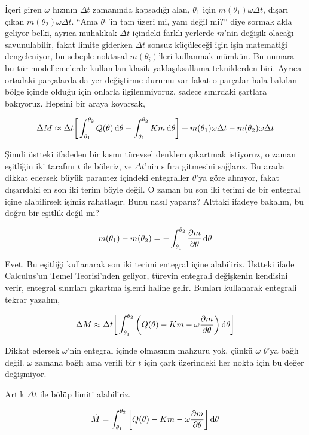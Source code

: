 \documentclass[12pt,fleqn]{article}\usepackage{../../common}
\begin{document}
İçeri giren $\omega$ hızının $\Delta t$ zamanında kapsadığı alan,
$\theta_1$ için $m(\theta_1) \omega \Delta t$, dışarı çıkan
$m(\theta_2) \omega \Delta t$. ``Ama $\theta_1$'in tam üzeri mi, yanı değil
mi?'' diye sormak akla geliyor belki, ayrıca muhakkak $\Delta t$ içindeki
farklı yerlerde $m$'nin değişik olacağı savunulabilir, fakat limite
giderken $\Delta t$ sonsuz küçüleceği için işin matematiği dengeleniyor, bu
sebeple noktasal $m(\theta_i)$'leri kullanmak mümkün. Bu numara bu tür
modellemelerde kullanılan klasik yaklaşıksallama tekniklerden biri. Ayrıca
ortadaki parçalarda da yer değiştirme durumu var fakat o parçalar hala
bakılan bölge içinde olduğu için onlarla ilgilenmiyoruz, sadece sınırdaki
şartlara bakıyoruz.  Hepsini bir araya koyarsak,

$$ 
\Delta M \approx \Delta t \bigg[ 
\int_{\theta_1}^{\theta_2} Q(\theta) \,\mathrm{d}\theta -
\int_{\theta_1}^{\theta_2}  Km \,\mathrm{d}\theta
\bigg] + 
m(\theta_1) \omega \Delta t -
m(\theta_2) \omega \Delta t
$$

Şimdi üstteki ifadeden bir kısmı türevsel denklem çıkartmak istiyoruz, o
zaman eşitliğin iki tarafını $t$ ile böleriz, ve $\Delta t$'nin sıfıra
gitmesini sağlarız. Bu arada dikkat edersek büyük parantez içindeki
entegraller $\theta$'ya göre alınıyor, fakat dışarıdaki en son iki terim
böyle değil. O zaman bu son iki terimi de bir entegral içine alabilirsek
işimiz rahatlaşır. Bunu nasıl yaparız? Alttaki ifadeye bakalım, bu doğru
bir eşitlik değil mi? 

$$ 
m(\theta_1) - m(\theta_2)  = 
-\int_{\theta_1}^{\theta_2} 
\frac{\partial m}{\partial \theta} \,\mathrm{d}\theta
$$

Evet. Bu eşitliği kullanarak son iki terimi entegral içine
alabiliriz. Üstteki ifade Calculus'un Temel Teorisi'nden geliyor, türevin
entegrali değişkenin kendisini verir, entegral sınırları çıkartma işlemi
haline gelir. Bunları kullanarak entegrali tekrar yazalım,

$$ 
\Delta M \approx \Delta t \bigg[ 
\int_{\theta_1}^{\theta_2}  \bigg(
Q(\theta)  -  Km  - \omega \frac{\partial m}{\partial \theta}
\bigg) \,\mathrm{d}\theta
\bigg] 
$$

Dikkat edersek $\omega$'nin entegral içinde olmasının mahzuru yok, çünkü
$\omega$ $\theta$'ya bağlı değil. $\omega$ zamana bağlı ama verili bir $t$
için çark üzerindeki her nokta için bu değer değişmiyor. 

Artık $\Delta t$ ile bölüp limiti alabiliriz, 

$$ 
\dot{M} = \int_{\theta_1}^{\theta_2}  \bigg[
Q(\theta)  -  Km  - \omega \frac{\partial m}{\partial \theta}
\bigg] \,\mathrm{d}\theta
$$
\end{document}
